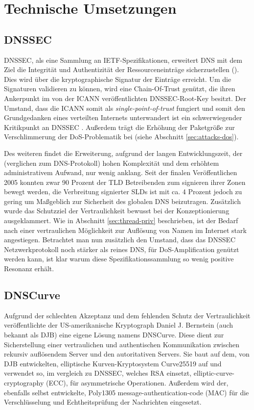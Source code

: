 \chapter{Technische Umsetzungen}
\label{chap:technologies}

\section{DNSSEC}
\label{sec:tec-dnssec}
DNSSEC, als eine Sammlung an IETF-Spezifikationen, erweitert DNS mit dem Ziel die Integrität und Authentizität der Ressourceneinträge sicherzustellen (\cite{Arends2005}). Dies wird über die kryptographische Signatur der Einträge erreicht. Um die Signaturen validieren zu können, wird eine Chain-Of-Trust genützt, die ihren Ankerpunkt im von der ICANN veröffentlichten DNSSEC-Root-Key besitzt. Der Umstand, dass die ICANN somit als \textit{single-point-of-trust} fungiert und somit den Grundgedanken eines verteilten Internets unterwandert ist ein schwerwiegender Kritikpunkt an DNSSEC \cite{Finch2014}. Außerdem trägt die Erhöhung der Paketgröße zur Verschlimmerung der DoS-Problematik bei (siehe Abschnitt \ref{sec:attacks-dos}). 

Des weiteren findet die Erweiterung, aufgrund der langen Entwicklungszeit, der (verglichen zum DNS-Protokoll) hohen Komplexität und dem erhöhtem administrativem Aufwand, nur wenig anklang. Seit der finalen Veröffentlichen 2005 konnten zwar 90 Prozent der TLD Betreibenden zum signieren ihrer Zonen bewegt werden, die Verbreitung signierter SLDs ist mit ca. 4 Prozent jedoch zu gering um Maßgeblich zur Sicherheit des globalen DNS beizutragen\cite{DCCommunications2018}. Zusätzlich wurde das Schutzziel der Vertraulichkeit bewusst bei der Konzeptionierung ausgeklammert. Wie in Abschnitt \ref{sec:thread-priv} beschrieben, ist der Bedarf nach einer vertraulichen Möglichkeit zur Auflösung von Namen im Internet stark angestiegen. Betrachtet man nun zusätzlich den Umstand, dass das DNSSEC Netzwerkprotokoll noch stärker als reines DNS, für DoS-Amplification genützt werden kann, ist klar warum diese Spezifikationssammlung so wenig positive Resonanz erhält\cite{Antic2014}.

\section{DNSCurve}
Aufgrund der schlechten Akzeptanz und dem fehlenden Schutz der Vertraulichkeit veröffentlichte der US-amerikanische Kryptograph Daniel J. Bernstein (auch bekannt als DJB) eine eigene Lösung namens DNSCurve. Diese dient zur Sicherstellung einer vertraulichen und authentischen Kommunikation zwischen rekursiv auflösendem Server und den autoritativen Servers. Sie baut auf dem, von DJB entwickelten, elliptische Kurven-Kryptosystem Curve25519 auf und verwendet so, im vergleich zu DNSSEC, welches RSA einsetzt, elliptic-curve-cryptography (ECC), für asymmetrische Operationen. Außerdem wird der, ebenfalls selbst entwickelte, Poly1305 message-authentication-code (MAC) für die Verschlüsselung und Echtheitsprüfung der Nachrichten eingesetzt. 

